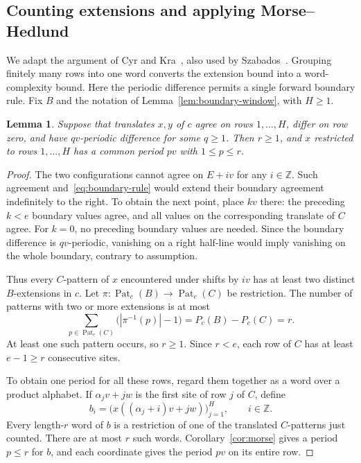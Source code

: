 \documentclass[11pt,a4paper,reqno]{amsart}
\newtheorem{lemma}[theorem]{Lemma}
\theoremstyle{remark}
\newcommand{\Z}{\mathbb Z}
\DeclareMathOperator{\Pat}{Pat}
\numberwithin{equation}{section}
\begin{document}
\subsection{Counting extensions and applying Morse--Hedlund}
We adapt the argument of Cyr and Kra~\cite[Lemma~2.24]{CK}, also used by Szabados~\cite[Lemma~4]{Sz}. Grouping finitely many rows into one word converts the extension bound into a word-complexity bound. Here the periodic difference permits a single forward boundary rule. Fix $B$ and the notation of Lemma~\ref{lem:boundary-window}, with $H\ge1$.

\begin{lemma}\label{lem:periodic-interior}
Suppose that translates $x,y$ of $c$ agree on rows $1,\ldots,H$, differ on row zero, and have $qv$-periodic difference for some $q\ge1$. Then $r\ge1$, and $x$ restricted to rows $1,\ldots,H$ has a common period $pv$ with $1\le p\le r$.
\end{lemma}
\begin{proof}
The two configurations cannot agree on $E+iv$ for any $i\in\Z$. Such agreement and~\eqref{eq:boundary-rule} would extend their boundary agreement indefinitely to the right. To obtain the next point, place $kv$ there: the preceding $k<e$ boundary values agree, and all values on the corresponding translate of $C$ agree. For $k=0$, no preceding boundary values are needed. Since the boundary difference is $qv$-periodic, vanishing on a right half-line would imply vanishing on the whole boundary, contrary to assumption.

Thus every $C$-pattern of $x$ encountered under shifts by $iv$ has at least two distinct $B$-extensions in $c$. Let $\pi:\Pat_c(B)\to\Pat_c(C)$ be restriction. The number of patterns with two or more extensions is at most
\[
 \sum_{p\in\Pat_c(C)}\bigl(|\pi^{-1}(p)|-1\bigr)
 =P_c(B)-P_c(C)=r.
\]
At least one such pattern occurs, so $r\ge1$. Since $r<e$, each row of $C$ has at least $e-1\ge r$ consecutive sites.

To obtain one period for all these rows, regard them together as a word over a product alphabet. If $\alpha_jv+jw$ is the first site of row $j$ of $C$, define
\[
 b_i=\bigl(x((\alpha_j+i)v+jw)\bigr)_{j=1}^{H},\qquad i\in\Z.
\]
Every length-$r$ word of $b$ is a restriction of one of the translated $C$-patterns just counted. There are at most $r$ such words. Corollary~\ref{cor:morse} gives a period $p\le r$ for $b$, and each coordinate gives the period $pv$ on its entire row.
\end{proof}
\end{document}
